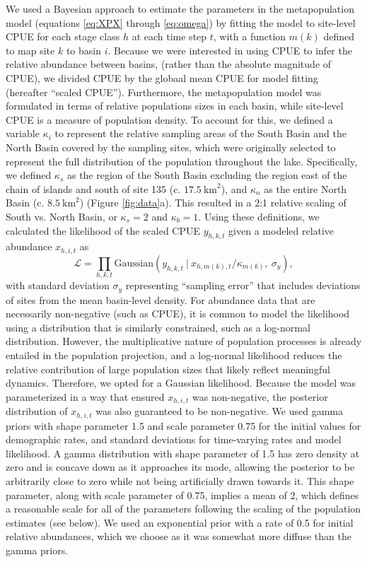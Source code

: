\documentclass[11pt]{article}
\begin{document}
We used a Bayesian approach to estimate the parameters in the metapopulation model
(equations \ref{eq:XPX} through \ref{eq:omega}) by fitting the model to site-level
CPUE for each stage class $h$ at each time step $t$,
with a function $m(k)$ defined to map site $k$ to basin $i$.
Because we were interested in using CPUE to infer the relative abundance between basins,
(rather than the absolute magnitude of CPUE), 
we divided CPUE by the globaal mean CPUE for model fitting (hereafter ``scaled CPUE''). 
Furthermore, the metapopulation model was formulated in terms of 
relative populations sizes in each basin,
while site-level CPUE is a measure of population density.
To account for this, we defined a variable $\kappa_i$ to represent the relative 
sampling areas of the South Basin and the North Basin covered by the sampling sites,
which were originally selected to represent the full distribution 
of the population throughout the lake.
Specifically, we defined $\kappa_s$ as the region of the South Basin excluding the region 
east of the chain of islands and south of site 135 (c. $17.5~\text{km}^2$),
and $\kappa_n$ as the entire North Basin (c. $8.5~\text{km}^2$) (Figure \ref{fig:data}a).
This resulted in a 2:1 relative scaling of South vs. North Basin,
or $\kappa_s = 2$ and $\kappa_b = 1$.
Using these definitions, we calculated the likelihood of the scaled CPUE $y_{h,k,t}$
given a modeled relative abundance $x_{h,i,t}$ as
%
\begin{equation} \label{eq:likelihood}
\mathcal{L} = 
\displaystyle\prod_{h,k,t}
\text{Gaussian}
    \left(
        y_{h,k,t}~|~x_{h,m(k),t} / \kappa_{m(k)},~\sigma_y
    \right),
\end{equation}
%
with standard deviation $\sigma_y$ representing ``sampling error'' 
that includes deviations of sites from the mean basin-level density.
For abundance data that are necessarily non-negative (such as CPUE), 
it is common to model the likelihood using a distribution that is similarly constrained,
such as a log-normal distribution. 
However, the multiplicative nature of population processes is already entailed 
in the population projection, 
and a log-normal likelihood reduces the relative contribution of large population sizes
that likely reflect meaningful dynamics.
Therefore, we opted for a Gaussian likelihood. 
Because the model was parameterized in a way that ensured
$x_{h,i,t}$ was non-negative,
the posterior distribution of $x_{h,i,t}$ was also guaranteed to be non-negative. 
We used gamma priors with shape parameter 1.5 and scale parameter 0.75
for the initial values for demographic rates,
and standard deviations for time-varying rates and model likelihood.
A gamma distribution with shape parameter of 1.5 has zero density at zero 
and is concave down as it approaches its mode,
allowing the posterior to be arbitrarily close to zero 
while not being artificially drawn towards it.
This shape parameter, along with scale parameter of 0.75,
implies a mean of 2, 
which defines a reasonable scale for all of the parameters 
following the scaling of the population estimates (see below).
We used an exponential prior with a rate of 0.5 for initial relative abundances,
which we choose as it was somewhat more diffuse than the gamma priors.
\end{document}
